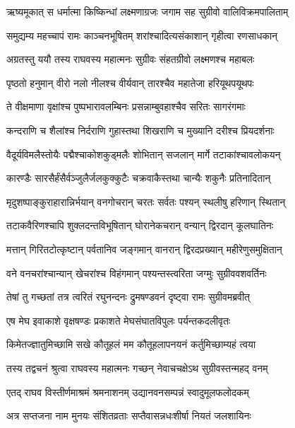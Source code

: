 
\twolineshloka
{ऋष्यमूकात् स धर्मात्मा किष्किन्धां लक्ष्मणाग्रजः}
{जगाम सह सुग्रीवो वालिविक्रमपालिताम्} %

\twolineshloka
{समुद्यम्य महच्चापं रामः काञ्चनभूषितम्}
{शरांश्चादित्यसंकाशान् गृहीत्वा रणसाधकान्} %

\twolineshloka
{अग्रतस्तु ययौ तस्य राघवस्य महात्मनः}
{सुग्रीवः संहतग्रीवो लक्ष्मणश्च महाबलः} %

\twolineshloka
{पृष्ठतो हनुमान् वीरो नलो नीलश्च वीर्यवान्}
{तारश्चैव महातेजा हरियूथपयूथपः} %

\twolineshloka
{ते वीक्षमाणा वृक्षांश्च पुष्पभारावलम्बिनः}
{प्रसन्नाम्बुवहाश्चैव सरितः सागरंगमाः} %

\twolineshloka
{कन्दराणि च शैलांश्च निर्दराणि गुहास्तथा}
{शिखराणि च मुख्यानि दरीश्च प्रियदर्शनाः} %

\twolineshloka
{वैदूर्यविमलैस्तोयैः पद्मैश्चाकोशकुड्मलैः}
{शोभितान् सजलान् मार्गे तटाकांश्चावलोकयन्} %

\twolineshloka
{कारण्डैः सारसैर्हंसैर्वञ्जुलैर्जलकुक्कुटैः}
{चक्रवाकैस्तथा चान्यैः शकुनैः प्रतिनादितान्} %

\twolineshloka
{मृदुशष्पाङ्कुराहारान्निर्भयान् वनगोचरान्}
{चरतः सर्वतः पश्यन् स्थलीषु हरिणान् स्थितान्} %

\twolineshloka
{तटाकवैरिणश्चापि शुक्लदन्तविभूषितान्}
{घोरानेकचरान् वन्यान् द्विरदान् कूलघातिनः} %

\twolineshloka
{मत्तान् गिरितटोत्कृष्टान् पर्वतानिव जङ्गमान्}
{वानरान् द्विरदप्रख्यान् महीरेणुसमुक्षितान्} %

\twolineshloka
{वने वनचरांश्चान्यान् खेचरांश्च विहंगमान्}
{पश्यन्तस्त्वरिता जग्मुः सुग्रीववशवर्तिनः} %

\twolineshloka
{तेषां तु गच्छतां तत्र त्वरितं रघुनन्दनः}
{द्रुमषण्डवनं दृष्ट्वा रामः सुग्रीवमब्रवीत्} %

\twolineshloka
{एष मेघ इवाकाशे वृक्षषण्डः प्रकाशते}
{मेघसंघातविपुलः पर्यन्तकदलीवृतः} %

\twolineshloka
{किमेतज्ज्ञातुमिच्छामि सखे कौतूहलं मम}
{कौतूहलापनयनं कर्तुमिच्छाम्यहं त्वया} %

\twolineshloka
{तस्य तद्वचनं श्रुत्वा राघवस्य महात्मनः}
{गच्छन् नेवाचचक्षेऽथ सुग्रीवस्तन्महद् वनम्} %

\twolineshloka
{एतद् राघव विस्तीर्णमाश्रमं श्रमनाशनम्}
{उद्यानवनसम्पन्नं स्वादुमूलफलोदकम्} %

\twolineshloka
{अत्र सप्तजना नाम मुनयः संशितव्रताः}
{सप्तैवासन्नधःशीर्षा नियतं जलशायिनः} %

